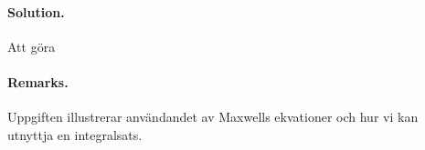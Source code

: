 \documentclass[%
oneside,                 %
final,                   %
10pt]{article}
\newenvironment{doconceexercise}{}{}
\begin{document}
\begin{doconceexercise}


\paragraph{Solution.}
Att göra



\paragraph{Remarks.}
Uppgiften illustrerar användandet av Maxwells ekvationer och hur vi kan utnyttja en integralsats.


\end{doconceexercise}


\end{document}

